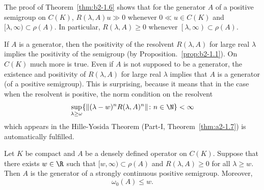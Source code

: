 \begin{remark}\label{rem:b2-1.7}
The proof of Theorem~\ref{thm:b2-1.6} shows that for the generator $A$ of a positive semigroup on $C(K)$, $R(\lambda,A)u \gg 0$ whenever $0 \ll u \in C(K)$ and $[\lambda,\infty) \subset \rho(A)$.
In particular, $R(\lambda,A) \geq 0$ whenever $\left[\lambda,\infty\right) \subset \rho(A)$.
\end{remark}
If\/ $A$ is a generator, then the positivity of the resolvent $R(\lambda,A)$ for large real $\lambda$ implies the positivity of the semigroup (by Proposition.~\ref{prop:b2-1.1}).
On $C(K)$ much more is true.
Even if\/ $A$ is not supposed to be a generator, the existence and positivity of\/ $R(\lambda,A)$ for large real $\lambda$ implies that $A$ is a generator (of a positive semigroup).
This is surprising, because it means that in the case when the resolvent is positive, the norm condition on the resolvent 
\[
\sup_{\lambda \geq \omega} \{\Vert (\lambda-w)^{n}R(\lambda,A)^{n} \Vert \colon n \in \N \} < \infty
\]
which appears in the Hille-Yosida Theorem (Part-I, Theorem~\ref{thm:a2-1.7}) is automatically fulfilled.

\begin{theorem}\label{thm:b2-1.8}
Let $K$ be compact and $A$ be a densely defined operator on $C(K)$.
Suppose that there exists $w \in \R$ such that $[w,\infty) \subset \rho(A)$ and $R(\lambda,A) \geq 0$ for all $\lambda \geq w$.
Then $A$ is the generator of a strongly continuous positive semigroup.
Moreover,
\begin{equation}\label{eq:b2-1.3}
    \omega_{0}(A) \leq w.
\end{equation}
\end{theorem}

